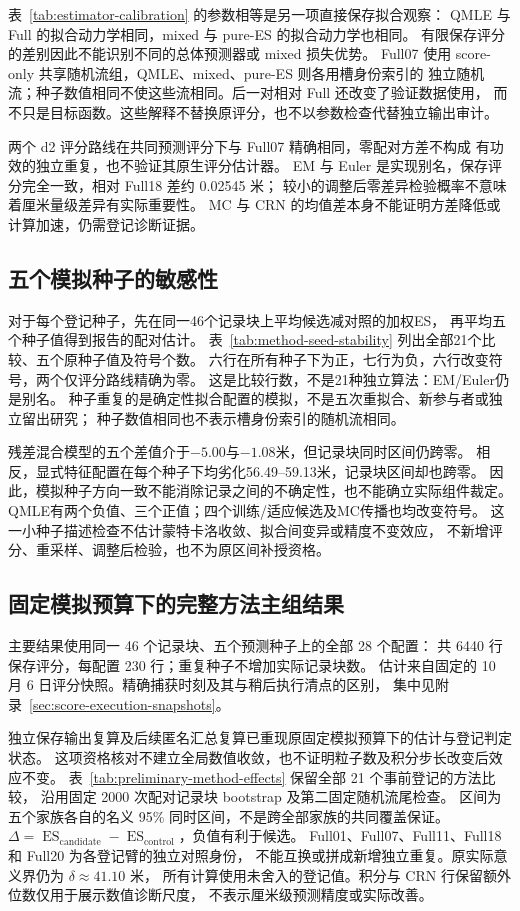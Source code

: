 \documentclass[UTF8,11pt]{ctexart}
\newcommand{\ES}{\operatorname{ES}}
\begin{document}
表~\ref{tab:estimator-calibration} 的参数相等是另一项直接保存拟合观察：
QMLE 与 Full 的拟合动力学相同，mixed 与 pure-ES 的拟合动力学也相同。
有限保存评分的差别因此不能识别不同的总体预测器或 mixed 损失优势。
Full07 使用 score-only 共享随机流组，QMLE、mixed、pure-ES 则各用槽身份索引的
独立随机流；种子数值相同不使这些流相同。后一对相对 Full 还改变了验证数据使用，
而不只是目标函数。这些解释不替换原评分，也不以参数检查代替独立输出审计。

两个 d2 评分路线在共同预测评分下与 Full07 精确相同，零配对方差不构成
有功效的独立重复，也不验证其原生评分估计器。
EM 与 Euler 是实现别名，保存评分完全一致，相对 Full18 差约 0.02545 米；
较小的调整后零差异检验概率不意味着厘米量级差异有实际重要性。
MC 与 CRN 的均值差本身不能证明方差降低或计算加速，仍需登记诊断证据。

\subsection{五个模拟种子的敏感性}
\label{sec:method-seed-stability}
对于每个登记种子，先在同一46个记录块上平均候选减对照的加权ES，
再平均五个种子值得到报告的配对估计。
表~\ref{tab:method-seed-stability} 列出全部21个比较、五个原种子值及符号个数。
六行在所有种子下为正，七行为负，六行改变符号，两个仅评分路线精确为零。
这是比较行数，不是21种独立算法：EM/Euler仍是别名。
种子重复的是确定性拟合配置的模拟，不是五次重拟合、新参与者或独立留出研究；
种子数值相同也不表示槽身份索引的随机流相同。

残差混合模型的五个差值介于$-5.00$与$-1.08$米，但记录块同时区间仍跨零。
相反，显式特征配置在每个种子下均劣化56.49--59.13米，记录块区间却也跨零。
因此，模拟种子方向一致不能消除记录之间的不确定性，也不能确立实际组件裁定。
QMLE有两个负值、三个正值；四个训练/适应候选及MC传播也均改变符号。
这一小种子描述检查不估计蒙特卡洛收敛、拟合间变异或精度不变效应，
不新增评分、重采样、调整后检验，也不为原区间补授资格。

\subsection{固定模拟预算下的完整方法主组结果}
\label{sec:preliminary-methods}
主要结果使用同一 46 个记录块、五个预测种子上的全部 28 个配置：
共 6440 行保存评分，每配置 230 行；重复种子不增加实际记录块数。
估计来自固定的 10 月 6 日评分快照。精确捕获时刻及其与稍后执行清点的区别，
集中见附录~\ref{sec:score-execution-snapshots}。

独立保存输出复算及后续匿名汇总复算已重现原固定模拟预算下的估计与登记判定状态。
这项资格核对不建立全局数值收敛，也不证明粒子数及积分步长改变后效应不变。
表~\ref{tab:preliminary-method-effects} 保留全部 21 个事前登记的方法比较，
沿用固定 2000 次配对记录块 bootstrap 及第二固定随机流尾检查。
区间为五个家族各自的名义 95\% 同时区间，不是跨全部家族的共同覆盖保证。
$\Delta=\ES_{\mathrm{candidate}}-\ES_{\mathrm{control}}$，负值有利于候选。
Full01、Full07、Full11、Full18 和 Full20 为各登记臂的独立对照身份，
不能互换或拼成新增独立重复。原实际意义界仍为 $\delta\approx41.10$ 米，
所有计算使用未舍入的登记值。积分与 CRN 行保留额外位数仅用于展示数值诊断尺度，
不表示厘米级预测精度或实际改善。
\end{document}
